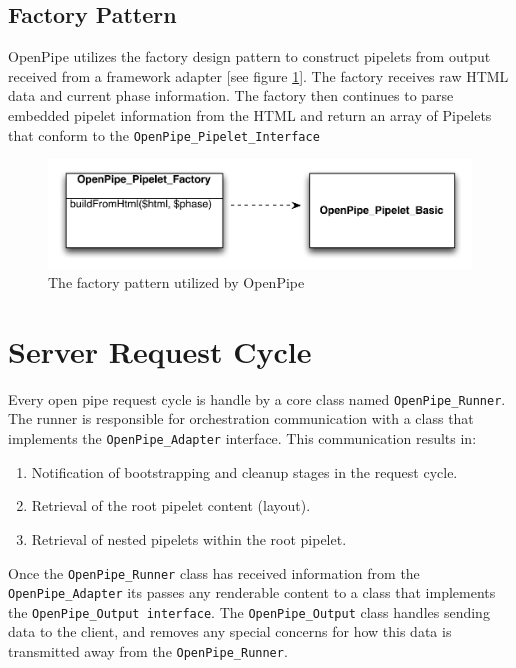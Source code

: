 \documentclass[12pt]{report}
\begin{document}
\subsection{Factory Pattern}
OpenPipe utilizes the factory design pattern to construct pipelets from output received from a framework adapter [see figure \ref{fig:factoryPattern}]. The factory receives raw HTML data and current phase information. The factory then continues to parse embedded pipelet information from the HTML and return an array of Pipelets that conform to the \texttt{OpenPipe\_Pipelet\_Interface} 

\begin{figure}[H]
\centering
\includegraphics[width=\textwidth,keepaspectratio]{figures/images/factory_pipelets.pdf}
\caption{The factory pattern utilized by OpenPipe}
\label{fig:factoryPattern}
\end{figure}


\section{Server Request Cycle}
Every open pipe request cycle is handle by a core class named \texttt{OpenPipe\_Runner}. The runner is responsible for orchestration communication with a class that implements the \texttt{OpenPipe\_Adapter} interface. This communication results in:

\begin{enumerate}
\item Notification of bootstrapping and cleanup stages in the request cycle.
\item Retrieval of the root pipelet content (layout).
\item Retrieval of nested pipelets within the root pipelet.
\end{enumerate}

Once the \texttt{OpenPipe\_Runner} class has received information from the \texttt{OpenPipe\_Adapter} its passes any renderable content to a class that implements the \texttt{OpenPipe\_Output interface}. The \texttt{OpenPipe\_Output} class handles sending data to the client, and removes any special concerns for how this data is transmitted away from the \texttt{OpenPipe\_Runner}.
\end{document}
